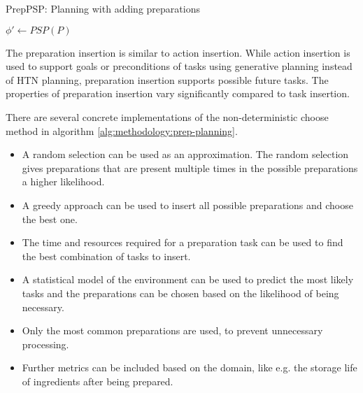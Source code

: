 \begin{algorithm}
    \caption{PrepPSP: Planning with adding preparations}
    \label{alg:methodology:prep-planning}
    $\phi' \leftarrow PSP(P)$\;
\end{algorithm}

The preparation insertion is similar to action insertion.
While action insertion is used to support goals or preconditions of tasks using generative planning instead of HTN planning, preparation insertion supports possible future tasks.
The properties of preparation insertion vary significantly compared to task insertion.

There are several concrete implementations of the non-deterministic choose method in algorithm \ref{alg:methodology:prep-planning}.

\begin{itemize}
  \item A random selection can be used as an approximation.
    The random selection gives preparations that are present multiple times in the possible preparations a higher likelihood.
  \item A greedy approach can be used to insert all possible preparations and choose the best one.
  \item The time and resources required for a preparation task can be used to find the best combination of tasks to insert.
  \item A statistical model of the environment can be used to predict the most likely tasks and the preparations can be chosen based on the likelihood of being necessary.
  \item Only the most common preparations are used, to prevent unnecessary processing.
  \item Further metrics can be included based on the domain, like e.g. the storage life of ingredients after being prepared.
\end{itemize}
